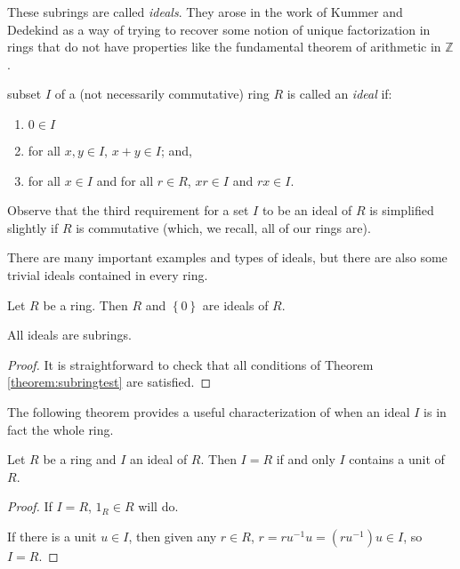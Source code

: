 \documentclass[english,course]{lecture}
\theoremstyle{plain}
\newenvironment{definition}[1]
  {\renewcommand\theinnerdefinition{#1}\innerdefinition}
  {\endinnerdefinition}
\def\set#1{\left\{ {#1} \right\}}
\def\Z{{\mathbb Z}}
\def\presnotes{}
\begin{document}
These subrings are called \emph{ideals}. They arose in the work of Kummer and Dedekind as a way of trying to recover some notion of unique factorization in rings that do not have properties like the fundamental theorem of arithmetic in $\Z$.



\begin{definition}
	A subset $I$ of a (not necessarily commutative) ring $R$ is called an \emph{ideal} if:
	\begin{enumerate}
	\item $0\in I$
	\item for all $x,y\in I$, $x+y\in I$; and,
	\item for all $x\in I$ and for all $r\in R$, $xr\in I$ and $rx\in I$.
\end{enumerate}
\end{definition}


Observe that the third requirement for a set $I$ to be an ideal of $R$ is simplified slightly if $R$ is commutative (which, we recall, all of our rings are).

There are many important examples and types of ideals, but there are also some trivial ideals contained in every ring.

\begin{theorem}
	Let $R$ be a ring.
	Then $R$ and $\set{0}$ are ideals of $R$.
\end{theorem}

\presnotes




\begin{theorem}
	All ideals are subrings.
\end{theorem}

\begin{proof}
	It is straightforward to check that all conditions of Theorem \ref{theorem:subringtest} are satisfied.
\end{proof}

\presnotes

The following theorem provides a useful characterization of when an ideal $I$ is in fact the whole ring.


\begin{theorem}
	Let $R$ be a ring and $I$ an ideal of $R$.
	Then $I = R$ if and only $I$ contains a unit of $R$.
\end{theorem}

\begin{proof}
	If $I = R$, $1_R\in R$ will do.
	
	If there is a unit $u\in I$, then given any $r\in R$, $r = r u^{-1} u = (ru^{-1}) u \in I$, so $I = R$.
\end{proof}
\end{document}

